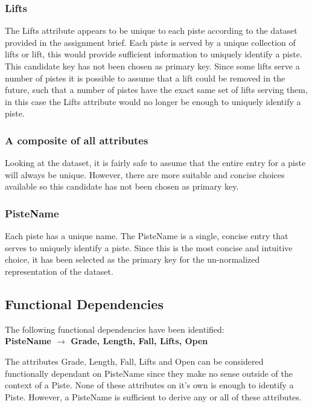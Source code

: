 \documentclass[titlepage ,12pt]{article}
\begin{document}
\subsubsection{Lifts}

The Lifts attribute appears to be unique to each piste according to the dataset provided in the assignment brief. Each piste is served by a unique collection of lifts or lift, this would provide sufficient information to uniquely identify a piste. \\
This candidate key has not been chosen as primary key. Since some lifts serve a number of pistes it is possible to assume that a lift could be removed in the future, such that a number of pistes have the exact same set of lifts serving them, in this case the Lifts attribute would no longer be enough to uniquely identify a piste.

\subsubsection{A composite of all attributes}

Looking at the dataset, it is fairly safe to assume that the entire entry for a piste will always be unique. However, there are more suitable and concise choices available so this candidate has not been chosen as primary key.

\subsubsection{PisteName}

Each piste has a unique name. The PisteName is a single, concise entry that serves to uniquely identify a piste. Since this is the most concise and intuitive choice, it has been selected as the primary key for the un-normalized representation of the dataset. 


\subsection{Functional Dependencies}
The following functional dependencies have been identified: \\

\textbf{PisteName \begin{math}\rightarrow\end{math} Grade, Length, Fall, Lifts, Open}

The attributes Grade, Length, Fall, Lifts and Open can be considered functionally dependant on PisteName since they make no sense outside of the context of a Piste. None of these attributes on it's own is enough to identify a Piste. However, a PisteName is sufficient to derive any or all of these attributes. \\ 
\end{document}
